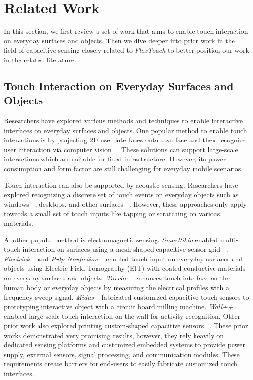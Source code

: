 \chapter{Related Work}
In this section, we first review a set of work that aims to enable touch interaction on everyday surfaces and objects. Then we dive deeper into prior work in the field of capacitive sensing closely related to \textit{FlexTouch} to better position our work in the related literature.

\section{Touch Interaction on Everyday Surfaces and Objects}
Researchers have explored various methods and techniques to enable interactive interfaces on everyday surfaces and objects. One popular method to enable touch interactions is by projecting 2D user interfaces onto a surface and then recognize user interaction via computer vision ~\cite{pinhanez2001everywhere, Fails-2002-Light-Widgets, Wilson-2010-Light-Space, Xiao-WorldKit}. These solutions can support large-scale interactions which are suitable for fixed infrastructure. However, its power consumption and form factor are still challenging for everyday mobile scenarios. 

Touch interaction can also be supported by acoustic sensing. Researchers have explored recognizing a discrete set of touch events on everyday objects such as windows ~\cite{Paradiso-2002-Window}, desktops, and other surfaces ~\cite{Harrison-2008-Scratch-iput}. However, these approaches only apply towards a small set of touch inputs like tapping or scratching on various materials.

Another popular method is electromagnetic sensing. \textit{SmartSkin} enabled multi-touch interaction on surfaces using a mesh-shaped capacitive sensor grid ~\cite{Rekimoto-SmartSkin}. \textit{Electrick} ~\cite{Zhang-Electrick} and \textit{Pulp Nonfiction} ~\cite{Zhang-pulp} enabled touch input on everyday surfaces and objects using Electric Field Tomography (EIT) with coated conductive materials on everyday surfaces and objects. \textit{Touche} ~\cite{Sato-Touche} enhances touch interface on the human body or everyday objects by measuring the electrical profiles with a frequency-sweep signal. \textit{Midas} ~\cite{Savage-2012-Midas} fabricated customized capacitive touch sensors to prototyping interactive object with a circuit board milling machine. \textit{Wall++} ~\cite{Zhang-wall} enabled large-scale touch interaction on the wall for activity recognition. Other prior work also explored printing custom-shaped capacitive sensors ~\cite{gong2014printsense,olberding2015foldio,olberding2014printscreen,vadgama2017flexy}. These prior works demonstrated very promising results, however, they rely heavily on dedicated sensing platforms and customized embedded systems to provide power supply, external sensors, signal processing, and communication modules. These requirements create barriers for end-users to easily fabricate customized touch interfaces.

